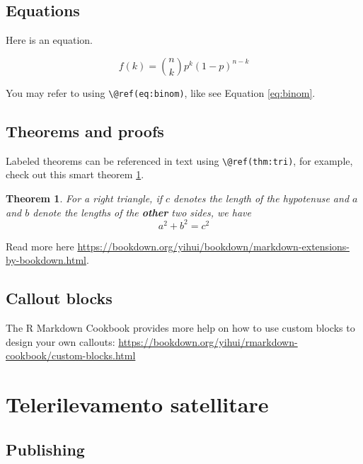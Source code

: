 \documentclass[
]{book}
\newtheorem{theorem}{Theorem}[chapter]
\theoremstyle{definition}
\theoremstyle{definition}
\theoremstyle{definition}
\theoremstyle{definition}
\theoremstyle{remark}
\begin{document}
\hypertarget{equations}{%
\section{Equations}\label{equations}}

Here is an equation.

\begin{equation} 
  f\left(k\right) = \binom{n}{k} p^k\left(1-p\right)^{n-k}
  \label{eq:binom}
\end{equation}

You may refer to using \texttt{\textbackslash{}@ref(eq:binom)}, like see Equation \eqref{eq:binom}.

\hypertarget{theorems-and-proofs}{%
\section{Theorems and proofs}\label{theorems-and-proofs}}

Labeled theorems can be referenced in text using \texttt{\textbackslash{}@ref(thm:tri)}, for example, check out this smart theorem \ref{thm:tri}.

\begin{theorem}
\protect\hypertarget{thm:tri}{}\label{thm:tri}For a right triangle, if \(c\) denotes the \emph{length} of the hypotenuse
and \(a\) and \(b\) denote the lengths of the \textbf{other} two sides, we have
\[a^2 + b^2 = c^2\]
\end{theorem}

Read more here \url{https://bookdown.org/yihui/bookdown/markdown-extensions-by-bookdown.html}.

\hypertarget{callout-blocks}{%
\section{Callout blocks}\label{callout-blocks}}

The R Markdown Cookbook provides more help on how to use custom blocks to design your own callouts: \url{https://bookdown.org/yihui/rmarkdown-cookbook/custom-blocks.html}

\hypertarget{telerilevamento-satellitare}{%
\chapter{Telerilevamento satellitare}\label{telerilevamento-satellitare}}

\hypertarget{publishing}{%
\section{Publishing}\label{publishing}}
\end{document}
